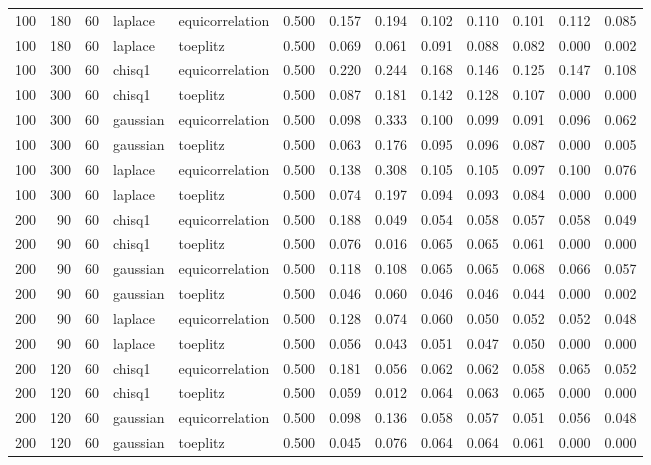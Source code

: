 \begin{tabular}{rrrllrrrrrrrr}
100 & 180 & 60 & laplace & equicorrelation & 0.500 & 0.157 & 0.194 & 0.102 & 0.110 & 0.101 & 0.112 & 0.085 \\
100 & 180 & 60 & laplace & toeplitz & 0.500 & 0.069 & 0.061 & 0.091 & 0.088 & 0.082 & 0.000 & 0.002 \\
100 & 300 & 60 & chisq1 & equicorrelation & 0.500 & 0.220 & 0.244 & 0.168 & 0.146 & 0.125 & 0.147 & 0.108 \\
100 & 300 & 60 & chisq1 & toeplitz & 0.500 & 0.087 & 0.181 & 0.142 & 0.128 & 0.107 & 0.000 & 0.000 \\
100 & 300 & 60 & gaussian & equicorrelation & 0.500 & 0.098 & 0.333 & 0.100 & 0.099 & 0.091 & 0.096 & 0.062 \\
100 & 300 & 60 & gaussian & toeplitz & 0.500 & 0.063 & 0.176 & 0.095 & 0.096 & 0.087 & 0.000 & 0.005 \\
100 & 300 & 60 & laplace & equicorrelation & 0.500 & 0.138 & 0.308 & 0.105 & 0.105 & 0.097 & 0.100 & 0.076 \\
100 & 300 & 60 & laplace & toeplitz & 0.500 & 0.074 & 0.197 & 0.094 & 0.093 & 0.084 & 0.000 & 0.000 \\
200 & 90 & 60 & chisq1 & equicorrelation & 0.500 & 0.188 & 0.049 & 0.054 & 0.058 & 0.057 & 0.058 & 0.049 \\
200 & 90 & 60 & chisq1 & toeplitz & 0.500 & 0.076 & 0.016 & 0.065 & 0.065 & 0.061 & 0.000 & 0.000 \\
200 & 90 & 60 & gaussian & equicorrelation & 0.500 & 0.118 & 0.108 & 0.065 & 0.065 & 0.068 & 0.066 & 0.057 \\
200 & 90 & 60 & gaussian & toeplitz & 0.500 & 0.046 & 0.060 & 0.046 & 0.046 & 0.044 & 0.000 & 0.002 \\
200 & 90 & 60 & laplace & equicorrelation & 0.500 & 0.128 & 0.074 & 0.060 & 0.050 & 0.052 & 0.052 & 0.048 \\
200 & 90 & 60 & laplace & toeplitz & 0.500 & 0.056 & 0.043 & 0.051 & 0.047 & 0.050 & 0.000 & 0.000 \\
200 & 120 & 60 & chisq1 & equicorrelation & 0.500 & 0.181 & 0.056 & 0.062 & 0.062 & 0.058 & 0.065 & 0.052 \\
200 & 120 & 60 & chisq1 & toeplitz & 0.500 & 0.059 & 0.012 & 0.064 & 0.063 & 0.065 & 0.000 & 0.000 \\
200 & 120 & 60 & gaussian & equicorrelation & 0.500 & 0.098 & 0.136 & 0.058 & 0.057 & 0.051 & 0.056 & 0.048 \\
200 & 120 & 60 & gaussian & toeplitz & 0.500 & 0.045 & 0.076 & 0.064 & 0.064 & 0.061 & 0.000 & 0.000 \\

\end{tabular}
